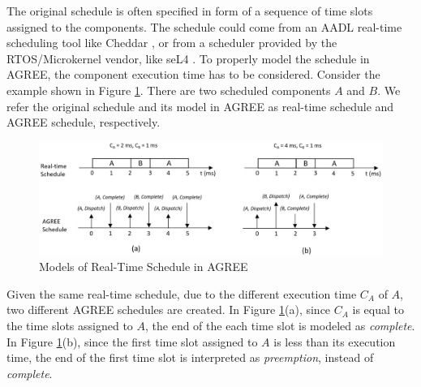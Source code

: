 The original schedule is often specified in form of a sequence of time slots assigned to the components. 
The schedule could come from an AADL real-time scheduling tool like Cheddar \cite{cheddar}, or from a scheduler provided by the RTOS/Microkernel vendor, like seL4 \cite{sel4}. 
To properly model the schedule in AGREE, the component execution time has to be considered. Consider the example shown in Figure \ref{RTschedule}. There are two scheduled components $A$ and $B$. We refer the original schedule and its model in AGREE as real-time schedule and AGREE schedule, respectively.
\begin{figure}[ht!]
\centering
\includegraphics[width=130mm]{RTschedule.jpg}
\caption{Models of Real-Time Schedule in AGREE\label{RTschedule}}
\end{figure}
Given the same real-time schedule, due to the different execution time $C_A$ of $A$, two different AGREE schedules are created. In Figure \ref{RTschedule}(a), since $C_A$ is equal to the time slots assigned to $A$, the end of the each time slot is modeled as \emph{complete}. In Figure \ref{RTschedule}(b), since the first time slot assigned to $A$ is less than its execution time, the end of the first time slot is interpreted as \emph{preemption}, instead of \emph{complete}.



